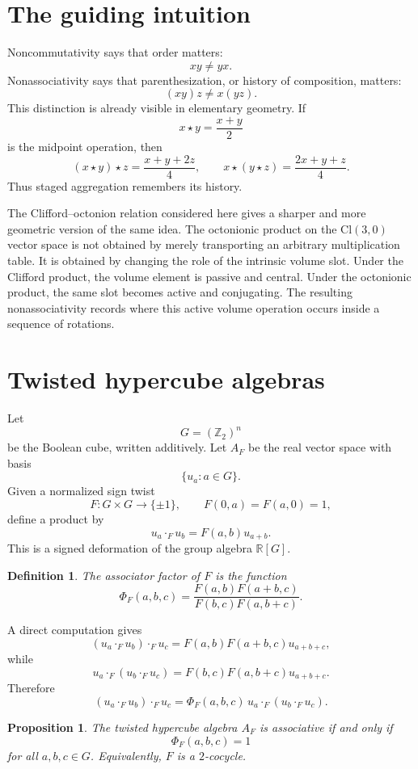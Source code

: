 \documentclass[11pt]{article}
\newtheorem{definition}{Definition}
\newtheorem{proposition}{Proposition}
\newcommand{\Ztwo}{\mathbb Z_2}
\newcommand{\R}{\mathbb R}
\newcommand{\Cl}{\mathrm{Cl}}
\newcommand{\assoc}{\Phi}
\begin{document}
\section{The guiding intuition}

Noncommutativity says that order matters:
\[
xy \neq yx.
\]
Nonassociativity says that parenthesization, or history of composition,
matters:
\[
(xy)z \neq x(yz).
\]
This distinction is already visible in elementary geometry. If
\[
x\star y = \frac{x+y}{2}
\]
is the midpoint operation, then
\[
(x\star y)\star z = \frac{x+y+2z}{4},
\qquad
x\star(y\star z) = \frac{2x+y+z}{4}.
\]
Thus staged aggregation remembers its history.

The Clifford--octonion relation considered here gives a sharper and more
geometric version of the same idea. The octonionic product on the
$\Cl(3,0)$ vector space is not obtained by merely transporting an arbitrary
multiplication table. It is obtained by changing the role of the intrinsic
volume slot. Under the Clifford product, the volume element is passive and
central. Under the octonionic product, the same slot becomes active and
conjugating. The resulting nonassociativity records where this active volume
operation occurs inside a sequence of rotations.

\section{Twisted hypercube algebras}

Let
\[
G = (\Ztwo)^n
\]
be the Boolean cube, written additively. Let $A_F$ be the real vector space
with basis
\[
\{u_a : a\in G\}.
\]
Given a normalized sign twist
\[
F:G\times G\to \{\pm 1\},
\qquad
F(0,a)=F(a,0)=1,
\]
define a product by
\[
u_a\cdot_F u_b = F(a,b)u_{a+b}.
\]
This is a signed deformation of the group algebra $\R[G]$.

\begin{definition}
The associator factor of $F$ is the function
\[
\assoc_F(a,b,c)
=
\frac{F(a,b)F(a+b,c)}
     {F(b,c)F(a,b+c)}.
\]
\end{definition}

A direct computation gives
\[
(u_a\cdot_F u_b)\cdot_F u_c
=
F(a,b)F(a+b,c)u_{a+b+c},
\]
while
\[
u_a\cdot_F (u_b\cdot_F u_c)
=
F(b,c)F(a,b+c)u_{a+b+c}.
\]
Therefore
\[
(u_a\cdot_F u_b)\cdot_F u_c
=
\assoc_F(a,b,c)\,
u_a\cdot_F (u_b\cdot_F u_c).
\]

\begin{proposition}
The twisted hypercube algebra $A_F$ is associative if and only if
\[
\assoc_F(a,b,c)=1
\]
for all $a,b,c\in G$.
Equivalently, $F$ is a $2$-cocycle.
\end{proposition}
\end{document}
